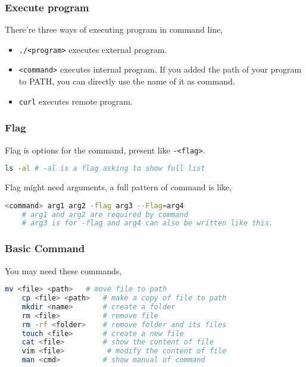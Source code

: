 \documentclass{beamer}
\begin{document}
\begin{frame}[fragile]
    \frametitle{Execute program}
There're three ways of executing program in command line,
\begin{itemize}
    \item \verb|./<program>| executes external program.
    \item \verb|<command>| executes internal program.
    If you added the path of your program to PATH, you can directly use the name of it as command.
    \item \verb|curl| executes remote program.
\end{itemize}
\end{frame}

\begin{frame}[fragile]
    \frametitle{Flag}
Flag is options for the command, present like \verb|-<flag>|.
\begin{lstlisting}[language=bash]
    ls -al # -al is a flag asking to show full list
\end{lstlisting}
Flag might need arguments, a full pattern of command is like, 
\begin{lstlisting}[language=bash]
    <command> arg1 arg2 -flag arg3 --Flag=arg4
    # arg1 and arg2 are required by command
    # arg3 is for -flag and arg4 can also be written like this.
\end{lstlisting}
\end{frame}

\begin{frame}[fragile]
    \frametitle{Basic Command}
You may need these commands,
\begin{lstlisting}[language=bash,morekeywords={mv,cp,mkdir,rm,touch,vim,man}]
    mv <file> <path>   # move file to path
    cp <file> <path>   # make a copy of file to path
    mkdir <name>       # create a folder
    rm <file>          # remove file
    rm -rf <folder>    # remove folder and its files
    touch <file>       # create a new file
    cat <file>         # show the content of file
    vim <file>          # modify the content of file
    man <cmd>          # show manual of command
\end{lstlisting}
\end{frame}
\end{document}
